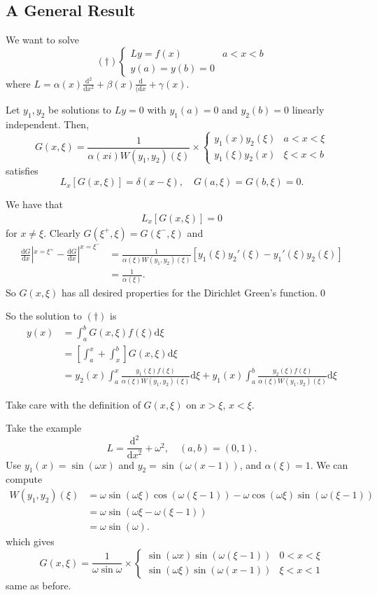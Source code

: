 \documentclass{article}
\begin{document}
\subsection{A General Result}
We want to solve
\[
	(\dagger)\begin{cases}
	  Ly=f(x) & a< x < b\\
	  y(a)=y(b)=0
  \end{cases}
\]
where $ L=\alpha(x)\frac{\mathrm d^2}{\mathrm dx^2}+\beta(x)\frac{\mathrm d}{(\mathrm dx}+\gamma(x) $.
\begin{proposition}
  Let $ y_1,y_2 $ be solutions to $ Ly=0 $ with $ y_1(a)=0 $ and $ y_2(b)=0 $ linearly independent. Then,
  \[
	  G(x,\xi)=\frac1{\alpha(xi)W(y_1,y_2)(\xi)}\times \begin{cases}
		    y_1(x)y_2(\xi) & a <x <\xi\\
		    y_1(\xi)y_2(x) & \xi< x < b
    \end{cases}
  \]
satisfies 
\[
	L_x[G(x,\xi)]=\delta(x-\xi),\quad G(a,\xi)=G(b,\xi)=0.
\]
\end{proposition}
\pf We have that
\begin{align*}
	L_x[G(x,\xi)]=0
\end{align*}
for $ x\ne \xi $. Clearly $ G(\xi^+,\xi)=G(\xi^-,\xi) $ and
\begin{align*}
	\frac{\mathrm dG}{\mathrm dx}|^{x=\xi^+}-\frac{\mathrm dG}{\mathrm dx}|^{x=\xi^-}&=\frac1{\alpha(\xi)W(y_1,y_2)(\xi)}\left[y_1(\xi)y_2'(\xi)-y_1'(\xi)y_2(\xi)\right]\\
											 &=\frac1{\alpha(\xi)}.
\end{align*}
So $ G(x,\xi) $ has all desired properties for the Dirichlet Green's function.\qed\par
So the solution to $ (\dagger) $ is
\begin{align*}
	y(x)&=\int_a^b G(x,\xi)f(\xi)\mathrm d\xi\\
	    &=\left[\int_a^x+\int_x^b\right]G(x,\xi)\mathrm d\xi\\
	    &=y_2(x)\int_a^x\frac{y_1(\xi)f(\xi)}{\alpha(\xi)W(y_1,y_2)(\xi)}\mathrm d\xi+y_1(x)\int_a^b\frac{y_2(\xi)f(\xi)}{\alpha(\xi)W(y_1,y_2)(\xi)}\mathrm d\xi
\end{align*}
\begin{remark}
  Take care with the definition of $ G(x,\xi) $ on $ x>\xi $, $ x<\xi $.
\end{remark}
Take the example
\[
	L=\frac{\mathrm d^2}{\mathrm dx^2}+\omega^2,\quad (a,b)=(0,1).
\]
Use $ y_1(x)=\sin(\omega x) $ and $ y_2=\sin(\omega(x-1)) $, and $ \alpha(\xi)=1 $. We can compute
\begin{align*}
	W(y_1,y_2)(\xi)&=\omega\sin(\omega\xi)\cos(\omega(\xi-1))-\omega\cos(\omega \xi)\sin(\omega(\xi-1))\\
		       &= \omega\sin(\omega \xi-\omega(\xi-1))\\
		       &=\omega\sin(\omega).
\end{align*}
which gives
\[
	G(x,\xi)=\frac1{\omega\sin\omega}\times\begin{cases}
		\sin(\omega x)\sin(\omega(\xi-1)) & 0< x < \xi \\
		\sin(\omega\xi)\sin(\omega(x-1)) & \xi < x < 1
	\end{cases}
\]
same as before.
\end{document}
